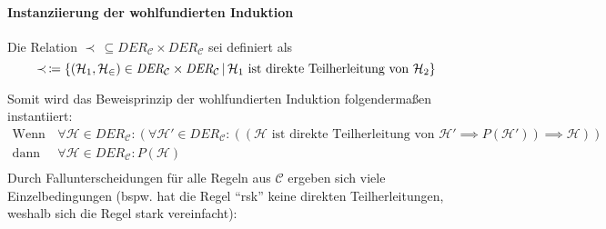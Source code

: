 																\paragraph{Instanziierung der wohlfundierten Induktion}
																	Die Relation $ \prec \,\subseteq \textit{DER} _ \mathcal{C} \times \textit{DER} _ \mathcal{C} $ sei definiert als \[ \prec \,\coloneqq \{ (\mathcal{H} _ 1, \mathcal{H _ 2}) \in \textit{DER} _ \mathcal{C} \times \textit{DER} _ \mathcal{C} \,\vert\, \mathcal{H} _ 1 \text{ ist direkte Teilherleitung von } \mathcal{H} _ 2 \} \]

																	Somit wird das Beweisprinzip der wohlfundierten Induktion folgendermaßen instantiiert:
																	\begin{align*}
																		\text{Wenn gilt:} & \,\forall \mathcal{H} \in \textit{DER} _ \mathcal{C} : (\forall \mathcal{H}' \in \textit{DER} _ \mathcal{C} : ((\mathcal{H} \text{ ist direkte Teilherleitung von } \mathcal{H}' \implies P(\mathcal{H}')) \implies \mathcal{H})) \\
																		\text{dann gilt:} & \,\forall \mathcal{H} \in \textit{DER} _ \mathcal{C} : P(\mathcal{H})                                                                                                                                                             \\
																	\end{align*}
																	Durch Fallunterscheidungen für alle Regeln aus $ \mathcal{C} $ ergeben sich viele Einzelbedingungen (bspw. hat die Regel \enquote{rsk} keine direkten Teilherleitungen, weshalb sich die Regel stark vereinfacht):
